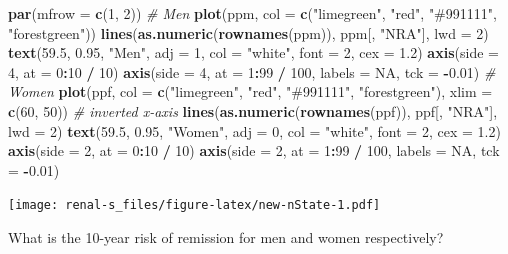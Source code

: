 \documentclass[
]{book}
\newenvironment{Shaded}{\begin{snugshade}}{\end{snugshade}}
\newcommand{\AttributeTok}[1]{\textcolor[rgb]{0.13,0.29,0.53}{#1}}
\newcommand{\CommentTok}[1]{\textcolor[rgb]{0.56,0.35,0.01}{\textit{#1}}}
\newcommand{\ConstantTok}[1]{\textcolor[rgb]{0.56,0.35,0.01}{#1}}
\newcommand{\DecValTok}[1]{\textcolor[rgb]{0.00,0.00,0.81}{#1}}
\newcommand{\FloatTok}[1]{\textcolor[rgb]{0.00,0.00,0.81}{#1}}
\newcommand{\FunctionTok}[1]{\textcolor[rgb]{0.13,0.29,0.53}{\textbf{#1}}}
\newcommand{\NormalTok}[1]{#1}
\newcommand{\SpecialCharTok}[1]{\textcolor[rgb]{0.81,0.36,0.00}{\textbf{#1}}}
\newcommand{\StringTok}[1]{\textcolor[rgb]{0.31,0.60,0.02}{#1}}
\begin{document}
\begin{enumerate}
\begin{Shaded}
\begin{Highlighting}[]
\FunctionTok{par}\NormalTok{(}\AttributeTok{mfrow =} \FunctionTok{c}\NormalTok{(}\DecValTok{1}\NormalTok{, }\DecValTok{2}\NormalTok{))}
\CommentTok{\# Men}
\FunctionTok{plot}\NormalTok{(ppm, }\AttributeTok{col =} \FunctionTok{c}\NormalTok{(}\StringTok{"limegreen"}\NormalTok{, }\StringTok{"red"}\NormalTok{, }\StringTok{"\#991111"}\NormalTok{, }\StringTok{"forestgreen"}\NormalTok{))}
\FunctionTok{lines}\NormalTok{(}\FunctionTok{as.numeric}\NormalTok{(}\FunctionTok{rownames}\NormalTok{(ppm)), ppm[, }\StringTok{"NRA"}\NormalTok{], }\AttributeTok{lwd =} \DecValTok{2}\NormalTok{)}
\FunctionTok{text}\NormalTok{(}\FloatTok{59.5}\NormalTok{, }\FloatTok{0.95}\NormalTok{, }\StringTok{"Men"}\NormalTok{, }\AttributeTok{adj =} \DecValTok{1}\NormalTok{, }\AttributeTok{col =} \StringTok{"white"}\NormalTok{, }\AttributeTok{font =} \DecValTok{2}\NormalTok{, }\AttributeTok{cex =} \FloatTok{1.2}\NormalTok{)}
\FunctionTok{axis}\NormalTok{(}\AttributeTok{side =} \DecValTok{4}\NormalTok{, }\AttributeTok{at =} \DecValTok{0}\SpecialCharTok{:}\DecValTok{10} \SpecialCharTok{/} \DecValTok{10}\NormalTok{)}
\FunctionTok{axis}\NormalTok{(}\AttributeTok{side =} \DecValTok{4}\NormalTok{, }\AttributeTok{at =} \DecValTok{1}\SpecialCharTok{:}\DecValTok{99} \SpecialCharTok{/} \DecValTok{100}\NormalTok{, }\AttributeTok{labels =} \ConstantTok{NA}\NormalTok{, }\AttributeTok{tck =} \SpecialCharTok{{-}}\FloatTok{0.01}\NormalTok{)}
\CommentTok{\# Women }
\FunctionTok{plot}\NormalTok{(ppf, }\AttributeTok{col =} \FunctionTok{c}\NormalTok{(}\StringTok{"limegreen"}\NormalTok{, }\StringTok{"red"}\NormalTok{, }\StringTok{"\#991111"}\NormalTok{, }\StringTok{"forestgreen"}\NormalTok{),}
          \AttributeTok{xlim =} \FunctionTok{c}\NormalTok{(}\DecValTok{60}\NormalTok{, }\DecValTok{50}\NormalTok{)) }\CommentTok{\# inverted x{-}axis}
\FunctionTok{lines}\NormalTok{(}\FunctionTok{as.numeric}\NormalTok{(}\FunctionTok{rownames}\NormalTok{(ppf)), ppf[, }\StringTok{"NRA"}\NormalTok{], }\AttributeTok{lwd =} \DecValTok{2}\NormalTok{)}
\FunctionTok{text}\NormalTok{(}\FloatTok{59.5}\NormalTok{, }\FloatTok{0.95}\NormalTok{, }\StringTok{"Women"}\NormalTok{, }\AttributeTok{adj =} \DecValTok{0}\NormalTok{, }\AttributeTok{col =} \StringTok{"white"}\NormalTok{, }\AttributeTok{font =} \DecValTok{2}\NormalTok{, }\AttributeTok{cex =} \FloatTok{1.2}\NormalTok{)}
\FunctionTok{axis}\NormalTok{(}\AttributeTok{side =} \DecValTok{2}\NormalTok{, }\AttributeTok{at =} \DecValTok{0}\SpecialCharTok{:}\DecValTok{10} \SpecialCharTok{/} \DecValTok{10}\NormalTok{)}
\FunctionTok{axis}\NormalTok{(}\AttributeTok{side =} \DecValTok{2}\NormalTok{, }\AttributeTok{at =} \DecValTok{1}\SpecialCharTok{:}\DecValTok{99} \SpecialCharTok{/} \DecValTok{100}\NormalTok{, }\AttributeTok{labels =} \ConstantTok{NA}\NormalTok{, }\AttributeTok{tck =} \SpecialCharTok{{-}}\FloatTok{0.01}\NormalTok{)}
\end{Highlighting}
\end{Shaded}

  \texttt{[image: renal-s\_files/figure-latex/new-nState-1.pdf]}

  What is the 10-year risk of remission for men and women respectively?
\end{enumerate}

  
\end{document}
